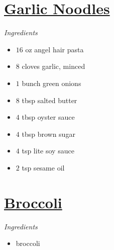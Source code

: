 \documentclass{article}
\newcommand{\ingredients}[1][\Large\emph{Ingredients}]{%
    \emph{#1}\\}
\begin{document}
\begin{minipage}{\textwidth}
\begin{multicols*}{2}
\begin{minipage}{\linewidth}
\section*{\underline{Garlic Noodles}}
\ingredients
\vspace{-1em}
\begin{itemize}
    \item $16$ oz angel hair pasta
    \item $8$ cloves garlic, minced
    \item $1$ bunch green onions
    \item $8$ tbsp salted butter
    \item $4$ tbsp oyster sauce
    \item $4$ tbsp brown sugar
    \item $4$ tsp lite soy sauce
    \item $2$ tsp sesame oil
\end{itemize}
\end{minipage}

\columnbreak
\begin{minipage}{\linewidth}
\section*{\underline{Broccoli}}
\ingredients
\vspace{-1em}
\begin{itemize}
    \item broccoli
\end{itemize}
\end{minipage}
\end{multicols*}
\end{minipage}
\end{document}
